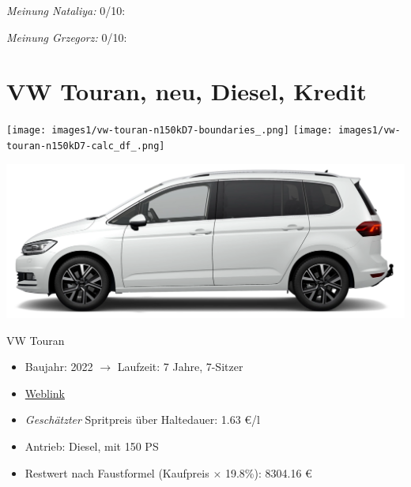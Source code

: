 \documentclass[landscape, DIV=99, 14pt]{scrartcl}
\begin{document}
\begin{small}
\emph{Meinung Nataliya:} 0/10: 
        
\emph{Meinung Grzegorz:} 0/10: 
\end{small}

\pagebreak


\twocolumn

\section*{VW Touran, neu, Diesel, Kredit}
\begin{center}
\texttt{[image: images1/vw-touran-n150kD7-boundaries\_.png]}
\null
\vspace{0.5cm}
\texttt{[image: images1/vw-touran-n150kD7-calc\_df\_.png]}
\end{center}

\pagebreak
\begin{center}
\includegraphics[width=0.9\columnwidth]{cars/vw-touran-neu-benzin.png}

VW Touran
\end{center}

\begin{itemize}
    \item Baujahr: 2022 $\rightarrow$ Laufzeit: 7 Jahre, 7-Sitzer
    \item \href{https://www.volkswagen.de/de/konfigurator.html/__app/touran/touran/highline.app?buildabilityStatus-app=buildable&category-app=private&carlineId-app=31000&salesGroupId-app=32600&trimName-app=Highline&modelId-app=5T146Z%24GYORYOR&modelVersion-app=1&modelYear-app=2022&exteriorId-app=F14+0Q0Q&interiorId-app=F56+++++BG&options-app=GWBGWBG-GPG3PG3-MAHV1M6-GPF9PF9-GRBDRBD-MKSUKA1-MSSH4KF-GP19P19-MVTV9IJ-GWQ1WQ1}{Weblink}
    \item \emph{Gesch\"atzter} Spritpreis \"uber Haltedauer: 1.63 \euro{}/l
    \item Antrieb: Diesel, mit 150 PS
    \item Restwert nach Faustformel (Kaufpreis $\times$ 19.8\%): 8304.16 \euro{}
\end{itemize}
\end{document}
